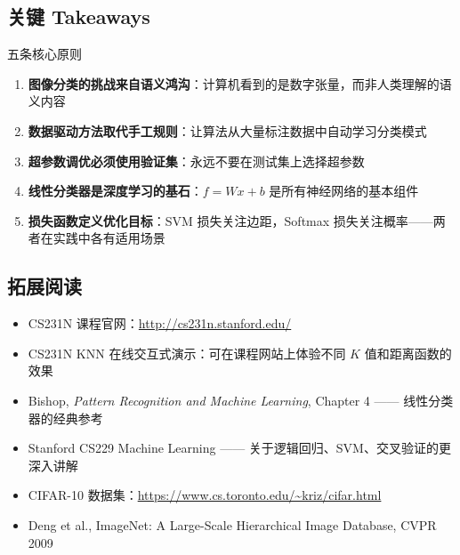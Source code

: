 \subsection{关键 Takeaways}

\begin{importantbox}{五条核心原则}
\begin{enumerate}
    \item \textbf{图像分类的挑战来自语义鸿沟}：计算机看到的是数字张量，而非人类理解的语义内容
    \item \textbf{数据驱动方法取代手工规则}：让算法从大量标注数据中自动学习分类模式
    \item \textbf{超参数调优必须使用验证集}：永远不要在测试集上选择超参数
    \item \textbf{线性分类器是深度学习的基石}：$f = Wx + b$ 是所有神经网络的基本组件
    \item \textbf{损失函数定义优化目标}：SVM 损失关注边距，Softmax 损失关注概率——两者在实践中各有适用场景
\end{enumerate}
\end{importantbox}

\subsection{拓展阅读}

\begin{itemize}
    \item CS231N 课程官网：\url{http://cs231n.stanford.edu/}
    \item CS231N KNN 在线交互式演示：可在课程网站上体验不同 $K$ 值和距离函数的效果
    \item Bishop, \textit{Pattern Recognition and Machine Learning}, Chapter 4 —— 线性分类器的经典参考
    \item Stanford CS229 Machine Learning —— 关于逻辑回归、SVM、交叉验证的更深入讲解
    \item CIFAR-10 数据集：\url{https://www.cs.toronto.edu/~kriz/cifar.html}
    \item Deng et al., ImageNet: A Large-Scale Hierarchical Image Database, CVPR 2009
\end{itemize}


